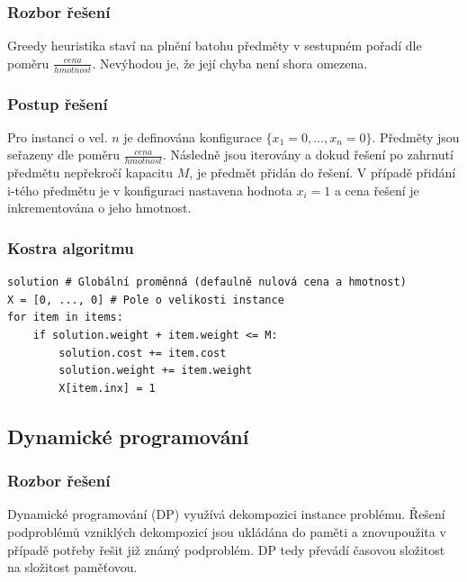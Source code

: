 \documentclass[12pt]{article}
\begin{document}
\subsubsection{Rozbor řešení}

Greedy heuristika staví na plnění batohu předměty v sestupném pořadí dle poměru \(\frac{cena}{hmotnost}\). Nevýhodou je, že její chyba není shora omezena.

\subsubsection{Postup řešení}

Pro instanci o vel. $n$ je definována konfigurace $\{x_1=0,...,x_n=0\}$. Předměty jsou seřazeny dle poměru \(\frac{cena}{hmotnost}\). Následně jsou iterovány a dokud řešení po zahrnutí předmětu nepřekročí kapacitu $M$, je předmět přidán do řešení. V případě přidání i-tého předmětu je v konfiguraci nastavena hodnota $x_i=1$ a cena řešení je inkrementována o jeho hmotnost.

\subsubsection{Kostra algoritmu}

\begin{listing}[ht]
    \begin{verbatim}
solution # Globální proměnná (defaulně nulová cena a hmotnost)
X = [0, ..., 0] # Pole o velikosti instance
for item in items:
    if solution.weight + item.weight <= M:
        solution.cost += item.cost
        solution.weight += item.weight
        X[item.inx] = 1
    \end{verbatim}
\end{listing}

\subsection{Dynamické programování}

\subsubsection{Rozbor řešení}

Dynamické programování (DP) využívá dekompozici instance problému. Řešení podproblémů vzniklých dekompozicí jsou ukládána do paměti a znovupoužita v případě potřeby řešit již známý podproblém. DP tedy převádí časovou složitost na složitost paměťovou.
\end{document}
